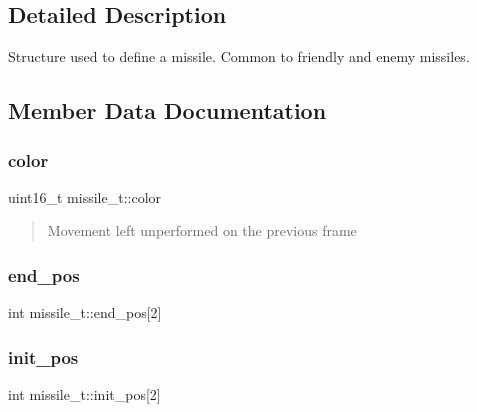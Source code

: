 \subsection{Detailed Description}
Structure used to define a missile. Common to friendly and enemy missiles. 

\subsection{Member Data Documentation}
\hypertarget{structmissile__t_ac4f6693bdb22fa048147f089f57c5d59}{}\label{structmissile__t_ac4f6693bdb22fa048147f089f57c5d59} 
\subsubsection{\texorpdfstring{color}{color}}
{\footnotesize\ttfamily uint16\+\_\+t missile\+\_\+t\+::color}



\begin{quote}
Movement left unperformed on the previous frame \end{quote}


\hypertarget{structmissile__t_acfc81d3ad2e8655c604ed499d038256d}{}\label{structmissile__t_acfc81d3ad2e8655c604ed499d038256d} 
\subsubsection{\texorpdfstring{end\+\_\+pos}{end\_pos}}
{\footnotesize\ttfamily int missile\+\_\+t\+::end\+\_\+pos\mbox{[}2\mbox{]}}

\hypertarget{structmissile__t_ae9b8a60e3fc505cbdc6a73eecec22593}{}\label{structmissile__t_ae9b8a60e3fc505cbdc6a73eecec22593} 
\subsubsection{\texorpdfstring{init\+\_\+pos}{init\_pos}}
{\footnotesize\ttfamily int missile\+\_\+t\+::init\+\_\+pos\mbox{[}2\mbox{]}}

\hypertarget{structmissile__t_a4b5fd447e6a7f348d5986e74d843e8e2}{}\label{structmissile__t_a4b5fd447e6a7f348d5986e74d843e8e2} 
